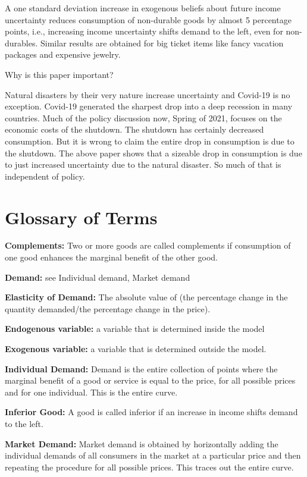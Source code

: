 \documentclass[
]{book}
\begin{document}
A one standard deviation increase in exogenous beliefs about future income uncertainty reduces consumption of non-durable goods by almost 5 percentage points, i.e., increasing income uncertainty shifts demand to the left, even for non-durables. Similar results are obtained for big ticket items like fancy vacation packages and expensive jewelry.

Why is this paper important?

Natural disasters by their very nature increase uncertainty and Covid-19 is no exception. Covid-19 generated the sharpest drop into a deep recession in many countries. Much of the policy discussion now, Spring of 2021, focuses on the economic costs of the shutdown. The shutdown has certainly decreased consumption. But it is wrong to claim the entire drop in consumption is due to the shutdown. The above paper shows that a sizeable drop in consumption is due to just increased uncertainty due to the natural disaster. So much of that is independent of policy.

\hypertarget{glossary-of-terms-3}{%
\section{Glossary of Terms}\label{glossary-of-terms-3}}

\textbf{Complements:} Two or more goods are called complements if consumption of one good enhances the marginal benefit of the other good.

\textbf{Demand:} see Individual demand, Market demand

\textbf{Elasticity of Demand:} The absolute value of (the percentage change in the quantity demanded/the percentage change in the price).

\textbf{Endogenous variable:} a variable that is determined inside the model

\textbf{Exogenous variable:} a variable that is determined outside the model.

\textbf{Individual Demand:} Demand is the entire collection of points where the marginal benefit of a good or service is equal to the price, for all possible prices and for one individual. This is the entire curve.

\textbf{Inferior Good:} A good is called inferior if an increase in income shifts demand to the left.

\textbf{Market Demand:} Market demand is obtained by horizontally adding the individual demands of all consumers in the market at a particular price and then repeating the procedure for all possible prices. This traces out the entire curve.
\end{document}
